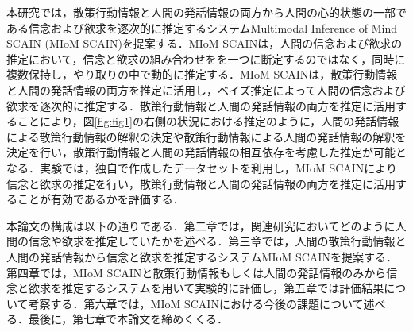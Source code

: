 
\par
本研究では，散策行動情報と人間の発話情報の両方から人間の心的状態の一部である信念および欲求を逐次的に推定するシステムMultimodal Inference of Mind SCAIN (MIoM SCAIN)を提案する．MIoM SCAINは，人間の信念および欲求の推定において，信念と欲求の組み合わせをを一つに断定するのではなく，同時に複数保持し，やり取りの中で動的に推定する．MIoM SCAINは，散策行動情報と人間の発話情報の両方を推定に活用し，ベイズ推定によって人間の信念および欲求を逐次的に推定する．散策行動情報と人間の発話情報の両方を推定に活用することにより，図\ref{fig:fig1}の右側の状況における推定のように，人間の発話情報による散策行動情報の解釈の決定や散策行動情報による人間の発話情報の解釈を決定を行い，散策行動情報と人間の発話情報の相互依存を考慮した推定が可能となる．実験では，独自で作成したデータセットを利用し，MIoM SCAINにより信念と欲求の推定を行い，散策行動情報と人間の発話情報の両方を推定に活用することが有効であるかを評価する．

\par
本論文の構成は以下の通りである．第二章では，関連研究においてどのように人間の信念や欲求を推定していたかを述べる．第三章では，人間の散策行動情報と人間の発話情報から信念と欲求を推定するシステムMIoM SCAINを提案する．第四章では，MIoM SCAINと散策行動情報もしくは人間の発話情報のみから信念と欲求を推定するシステムを用いて実験的に評価し，第五章では評価結果について考察する．第六章では，MIoM SCAINにおける今後の課題について述べる．最後に，第七章で本論文を締めくくる．
